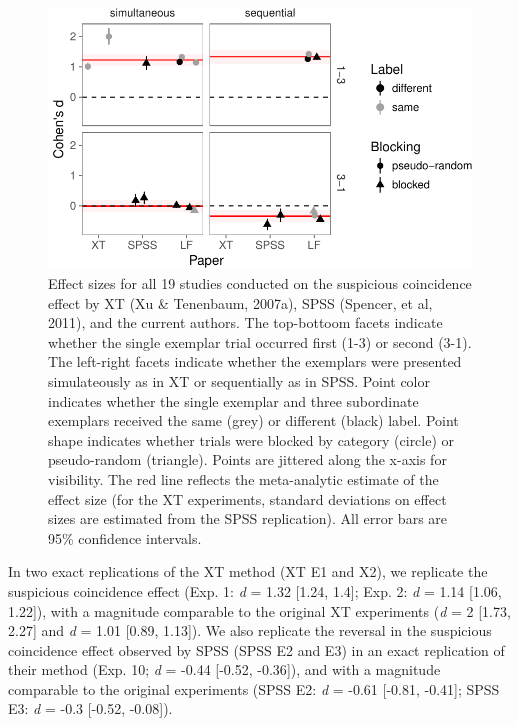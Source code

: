 \documentclass[english,floatsintext,man]{apa6}
\newcounter{author}
\theoremstyle{definition}
\theoremstyle{definition}
\theoremstyle{remark}
\begin{document}
\begin{figure}
\centering
\includegraphics{xtmem_files/figure-latex/unnamed-chunk-4-1.pdf}
\caption{\label{fig:unnamed-chunk-4}Effect sizes for all 19 studies
conducted on the suspicious coincidence effect by XT (Xu \& Tenenbaum,
2007a), SPSS (Spencer, et al, 2011), and the current authors. The
top-bottoom facets indicate whether the single exemplar trial occurred
first (1-3) or second (3-1). The left-right facets indicate whether the
exemplars were presented simulateously as in XT or sequentially as in
SPSS. Point color indicates whether the single exemplar and three
subordinate exemplars received the same (grey) or different (black)
label. Point shape indicates whether trials were blocked by category
(circle) or pseudo-random (triangle). Points are jittered along the
x-axis for visibility. The red line reflects the meta-analytic estimate
of the effect size (for the XT experiments, standard deviations on
effect sizes are estimated from the SPSS replication). All error bars
are 95\% confidence intervals.}
\end{figure}

In two exact replications of the XT method (XT E1 and X2), we replicate
the suspicious coincidence effect (Exp. 1: \emph{d} = 1.32 {[}1.24,
1.4{]}; Exp. 2: \emph{d} = 1.14 {[}1.06, 1.22{]}), with a magnitude
comparable to the original XT experiments (\emph{d} = 2 {[}1.73, 2.27{]}
and \emph{d} = 1.01 {[}0.89, 1.13{]}). We also replicate the reversal in
the suspicious coincidence effect observed by SPSS (SPSS E2 and E3) in
an exact replication of their method (Exp. 10; \emph{d} = -0.44
{[}-0.52, -0.36{]}), and with a magnitude comparable to the original
experiments (SPSS E2: \emph{d} = -0.61 {[}-0.81, -0.41{]}; SPSS E3:
\emph{d} = -0.3 {[}-0.52, -0.08{]}).
\end{document}
